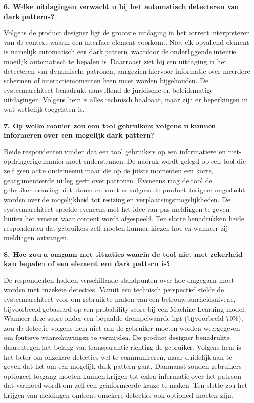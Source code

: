 \vspace{1em}

\textbf{6. Welke uitdagingen verwacht u bij het automatisch detecteren van dark patterns?}

Volgens de product designer ligt de grootste uitdaging in het correct interpreteren van de context waarin een interface-element voorkomt. Niet elk opvallend element is namelijk automatisch een dark pattern, waardoor de onderliggende intentie moeilijk automatisch te bepalen is. Daarnaast ziet hij een uitdaging in het detecteren van dynamische patronen, aangezien hiervoor informatie over meerdere schermen of interactiemomenten heen moet worden bijgehouden. De systeemarchitect benadrukt aanvullend de juridische en beleidsmatige uitdagingen. Volgens hem is alles technisch haalbaar, maar zijn er beperkingen in wat wettelijk toegelaten is.

\vspace{1em}

\textbf{7. Op welke manier zou een tool gebruikers volgens u kunnen informeren over een mogelijk dark pattern?}

Beide respondenten vinden dat een tool gebruikers op een informatieve en niet-opdringerige manier moet ondersteunen. De nadruk wordt gelegd op een tool die zelf geen actie onderneemt maar die op de juiste momenten een korte, geargumenteerde uitleg geeft over patronen. Eveneens mag de tool de gebruikerservaring niet storen en moet er volgens de product designer nagedacht worden over de mogelijkheid tot resizing en verplaatsingsmogelijkheden. De systeemarchitect speelde eveneens met het idee van pas meldingen te geven buiten het venster waar content wordt afgespeeld. Ten slotte benadrukken beide respondenten dat gebruikers zelf moeten kunnen kiezen hoe en wanneer zij meldingen ontvangen.

\newpage

\textbf{8. Hoe zou u omgaan met situaties waarin de tool niet met zekerheid kan bepalen of een element een dark pattern is?}

De respondenten hadden verschillende standpunten over hoe omgegaan moet worden met onzekere detecties. Vanuit een technisch perspectief stelde de systeemarchitect voor om gebruik te maken van een betrouwbaarheidsniveau, bijvoorbeeld gebaseerd op een probability-score bij een Machine Learning-model. Wanneer deze score onder een bepaalde drempelwaarde ligt (bijvoorbeeld 70\%), zou de detectie volgens hem niet aan de gebruiker moeten worden weergegeven om foutieve waarschuwingen te vermijden. De product designer benadrukte daarentegen het belang van transparantie richting de gebruiker. Volgens hem is het beter om onzekere detecties wel te communiceren, maar duidelijk aan te geven dat het om een mogelijk dark pattern gaat. Daarnaast zouden gebruikers optioneel toegang moeten kunnen krijgen tot extra informatie over het patroon dat vermoed wordt om zelf een geïnformeerde keuze te maken. Ten slotte zou het krijgen van meldingen omtrent onzekere detecties ook optioneel moeten zijn.

